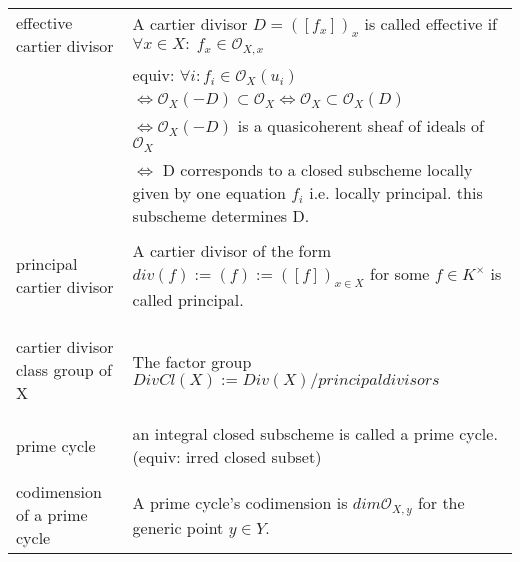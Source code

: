\documentclass[a4paper, 12pt]{article}
\newcommand{\ca}[1]{\mathcal{#1}}
\newcommand{\ox}{\mathcal{O}_X}
\newcommand{\oxx}{\mathcal{O}_{X,x}}
\begin{document}
\begin{longtable}{p{}  p{} }
  effective cartier divisor & A cartier divisor $D = ([f_x])_x$ is called effective if $\forall x \in X: \; f_x \in \oxx $\\

  & equiv: $\forall i :  f_i \in \ox(u_i)$\\
  &$\iff \ox(-D) \subset \ox \iff \ox \subset \ox(D)$\\
  &$\iff \ox(-D)$ is a quasicoherent sheaf of ideals of $ \ox$ \\
  & $\iff $ D corresponds to a closed subscheme locally given by  one equation $f_i$ i.e. locally principal. this subscheme determines D. \\

  &\\

  principal cartier divisor & A cartier divisor of the form $div(f) := (f) := ([f])_{x \in X}$ for some $f \in K^{\times}$ is called principal.\\

  \\



\\
\newline
\\




  cartier divisor class group of X & The factor group $DivCl(X) := Div(X)/{principal divisors}$\\

  &\\

\\




    prime cycle & an integral closed subscheme is called a prime cycle. (equiv: irred closed subset)\\

    &\\

    codimension of a prime cycle & A prime cycle's codimension is $dim \ca{O}_{X,y}$ for the generic point $y \in Y$.\\


\end{longtable}
\end{document}
